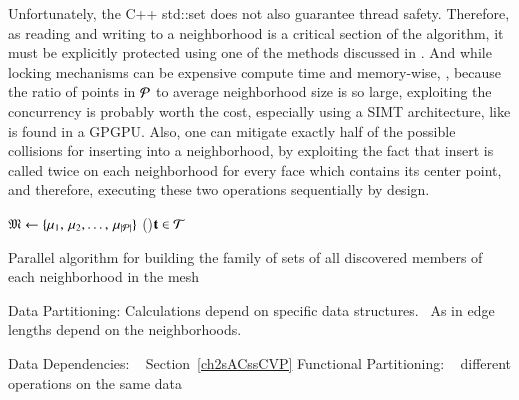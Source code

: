Unfortunately, the C++ std::set does not also guarantee thread safety. Therefore, as reading and writing to a neighborhood is a critical section of the algorithm, it must be explicitly protected using one of the methods discussed in . And while locking mechanisms can be expensive compute time and memory-wise, , because the ratio of points in $\mathcal{P}$ to average neighborhood size is so large, exploiting the concurrency is probably worth the cost, especially using a SIMT architecture, like is found in a GPGPU. Also, one can mitigate exactly half of the possible collisions for inserting into a neighborhood, by exploiting the fact that insert is called twice on each neighborhood for every face which contains its center point, and therefore, executing these two operations sequentially by design.

\begin{algorithm}
	\DontPrintSemicolon


	\bigskip
	\FuncArgSty{($\bT$)}\;
\nl		$\mathfrak{M} \leftarrow \{\mu_1,\,\mu_2,\ldots,\,\mu_{|\mathcal{P}|}\}$\;
\nl	\For(){$\mathbf{t} \in \mathcal{T}$}{
\nl		{}
	}
	\caption{Parallel algorithm for building the family of sets of all discovered members of each neighborhood in the mesh\label{alg:parallelBuildNeighborhoods}}
\end{algorithm}%
%
%

%
Data Partitioning:
Calculations depend on specific data structures.~\cite[p.~357]{Lang17}
As in edge lengths depend on the neighborhoods.

%
Data Dependencies: ~\cite[p.~358]{Lang17}
Section~\ref{ch2sACssCVP}
%
Functional Partitioning: ~\cite[p.~359]{Lang17}
different operations on the same data

